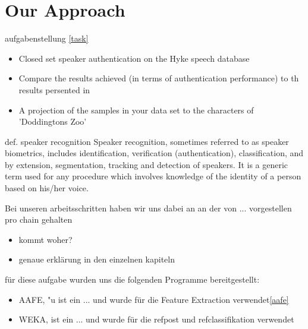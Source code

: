 \section{Our Approach}
\label{approach}


aufgabenstellung \ref{task}
\begin{itemize}
	\item[\textbullet] Closed set speaker authentication on the Hyke speech database
	\item[\textbullet]  Compare the results achieved (in terms of authentication performance) to th results persented in \cite{hyke}
	\item[\textbullet]  A projection of the samples in your data set to the characters of 'Doddingtons Zoo' 
\end{itemize}

def. speaker recognition \cite{beigi}
Speaker recognition, sometimes referred to as speaker biometrics, includes identification, verification (authentication), classification, and by extension, segmentation,
tracking and detection of speakers. It is a generic term used for any procedure which
involves knowledge of the identity of a person based on his/her voice.

Bei unseren arbeitsschritten haben wir uns dabei an
an der von ... vorgestellen pro chain gehalten
\begin{itemize}
	\item kommt woher? \cite{dittmann}
	\item genaue erklärung in den einzelnen kapiteln
\end{itemize}


für diese aufgabe wurden uns die folgenden Programme bereitgestellt:

\begin{itemize}
	\item[\textbullet]  AAFE, "u ist ein ... und wurde für die Feature Extraction verwendet\ref{aafe}
	\item[\textbullet]  WEKA, ist ein ... und wurde für die ref{post} und ref{classifikation} verwendet
\end{itemize}

